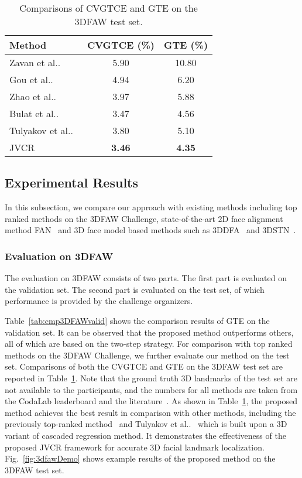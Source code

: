 \documentclass[a4paper,conference]{IEEEtran}
\makeatletter
\DeclareRobustCommand\onedot{\futurelet\@let@token\@onedot}
\def\@onedot{\ifx\@let@token.\else.\null\fi\xspace}
\def\etal{{et al}\onedot}
\makeatother
\begin{document}
\begin{table}[h]
	\centering
	\caption{Comparisons of CVGTCE and GTE on the 3DFAW test set.}
	\begin{tabular}{lcc}
		\toprule
		Method & CVGTCE (\%) & GTE (\%) \\
		\midrule
		Zavan \etal~\cite{de20163d} & 5.90 & 10.80 \\
		Gou \etal~\cite{gou2016shape} & 4.94 & 6.20 \\
		Zhao \etal~\cite{zhao2016fast} & 3.97  & 5.88 \\
		Bulat \etal~\cite{bulat2016two} & 3.47 & 4.56 \\
		Tulyakov \etal~\cite{Tulyakov2017Viewpoint} & 3.80   & 5.10\\
		\midrule
		JVCR  & \textbf{3.46}  & \textbf{4.35} \\
		\bottomrule
	\end{tabular}\label{tab:cmp3DFAWtest}\end{table}



\subsection{Experimental Results}
In this subsection, we compare our approach with existing methods including top ranked methods on the 3DFAW Challenge, state-of-the-art 2D face alignment method FAN~\cite{Bulat2017HowFar} and 3D face model based methods such as 3DDFA~\cite{zhu2016face} and 3DSTN~\cite{Bhagavatula2017Faster}.

\subsubsection{Evaluation on 3DFAW}
The evaluation on 3DFAW consists of two parts. 
The first part is evaluated on the validation set. 
The second part is evaluated on the test set, of which performance is provided by the challenge organizers.

Table~\ref{tab:cmp3DFAWvalid} shows the comparison results of GTE on the validation set.
It can be observed that the proposed method outperforms others, all of which are based on the two-step strategy. 
For comparison with top ranked methods on the 3DFAW Challenge, we further evaluate our method on the test set.
Comparisons of both the CVGTCE and GTE on the 3DFAW test set are reported in Table~\ref{tab:cmp3DFAWtest}.
Note that the ground truth 3D landmarks of the test set are not available to the participants, and the numbers for all methods are taken from the CodaLab leaderboard and the literature~\cite{jeni2016first,Tulyakov2017Viewpoint}.
As shown in Table~\ref{tab:cmp3DFAWtest}, the proposed method achieves the best result in comparison with other methods, including the previously top-ranked method~\cite{bulat2016two} and Tulyakov \etal~\cite{Tulyakov2017Viewpoint} which is built upon a 3D variant of cascaded regression method.
It demonstrates the effectiveness of the proposed JVCR framework for accurate 3D facial landmark localization.
Fig.~\ref{fig:3dfawDemo} shows example results of the proposed method on the 3DFAW test set.
\end{document}
